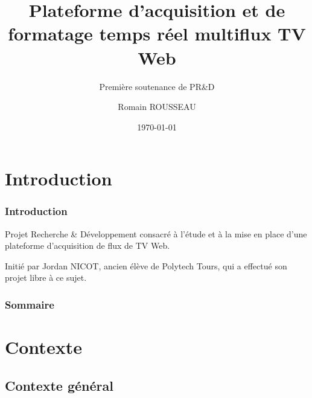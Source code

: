 \documentclass{beamer}
\begin{document}


\title[Plateforme d'acquisition multiflux TV Web]{Plateforme d'acquisition et de formatage temps réel multiflux TV Web}
\subtitle{Première soutenance de PR\&D}
\author{Romain ROUSSEAU}
\date{\today}

\begin{frame}
	
	\maketitle
	
\end{frame}



\section*{Introduction}


\begin{frame}

\frametitle{Introduction}

Projet Recherche \& Développement consacré à l'étude et à la mise en place d'une plateforme d'acquisition de flux de TV Web.

Initié par Jordan NICOT, ancien élève de Polytech Tours, qui a effectué son projet libre à ce sujet.

\end{frame}


\begin{frame}

\frametitle{Sommaire}

\tableofcontents


\end{frame}



\section{Contexte}

\subsection{Contexte général}
\end{document}
